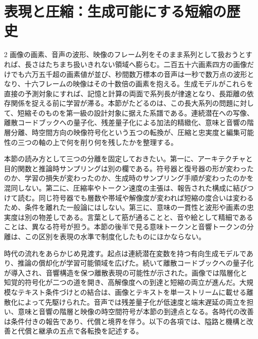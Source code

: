 \documentclass[lualatex,a4paper,10pt]{jlreq}
\begin{document}
\setcounter{tocdepth}{2}
\tableofcontents
\clearpage

\section{表現と圧縮：生成可能にする短縮の歴史}
\label{sec:representation}

\begin{multicols}{2}
\raggedcolumns
画像の画素、音声の波形、映像のフレーム列をそのまま系列として扱おうとすれば、長さはたちまち扱いきれない領域へ膨らむ。二百五十六画素四方の画像だけでも六万五千超の画素値が並び、秒間数万標本の音声は一秒で数万点の波形となり、十六フレームの映像はその十数倍の画素を抱える。生成モデルがこれらを直接の予測対象にすれば、記憶と計算の両面で系列長が律速となり、長距離の依存関係を捉える前に学習が滞る。本節がたどるのは、この長大系列の問題に対して、短縮そのものを第一級の設計対象に据えた系譜である。連続潜在への写像、離散コードブックへの量子化、残差量子化による加法的精緻化、意味と音響の階層分離、時空間方向の映像符号化という五つの転換が、圧縮と忠実度と編集可能性の三つの軸の上で何を削り何を残したかを整理する\autocite{btd001,btd002}。

本節の読み方として三つの分離を固定しておきたい。第一に、アーキテクチャと目的関数と推論時サンプリングは別の欄である。符号器と復号器の形が変わったのか、学習の損失が変わったのか、生成時のサンプリング手順が変わったのかを混同しない。第二に、圧縮率やトークン速度の主張は、報告された構成に結びつけて読む。同じ符号器でも層数や帯域や解像度が変われば短縮の度合いは変わるため、条件を離れた一般論にはしない\autocite{btd006,btd008}。第三に、意味の一貫性と波形や画素の忠実度は別の物差しである。言葉として筋が通ることと、音や絵として精細であることは、異なる符号が担う。本節の後半で見る意味トークンと音響トークンの分離は、この区別を表現の水準で制度化したものにほかならない\autocite{btd009,btd010}。

時代の流れをあらかじめ見渡す。起点は連続潜在変数を持つ有向生成モデルであり、推論の償却化が学習可能領域を広げた\autocite{btd001}。続いて離散コードブックへの量子化が導入され、音響構造を保つ離散表現の可能性が示された\autocite{btd002}。画像では階層化と知覚的符号化が二つの道を開き、高解像度への到達と短縮の両立が進んだ\autocite{btd003,btd004}。大規模なテキスト条件づけとの結合は、画像とテキストを単一ストリームに載せる離散化によって先駆けられた\autocite{btd005}。音声では残差量子化が低速度と端末遅延の両立を担い\autocite{btd006,btd007,btd008}、意味と音響の階層と映像の時空間符号が本節の到達点となる\autocite{btd009,btd010,btd012}。各時代の改善は条件付きの報告であり、代償と境界を伴う。以下の各項では、隘路と機構と改善と代償と継承の五点で各転換を記述する。
\end{multicols}
\end{document}
